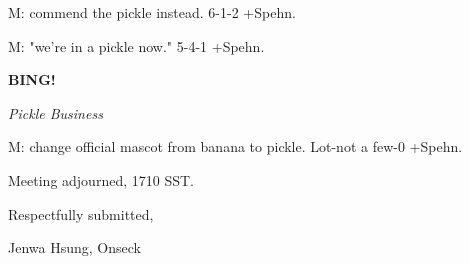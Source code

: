 \documentclass[12pt]{article}
\newcommand{\bing}{{\bf BING!} }
\newcommand{\goto}[1]{\bing \vskip 12pt \centerline{{\em{#1}}}}
\begin{document}
M: commend the pickle instead. 6-1-2 +Spehn.

M: "we're in a pickle now." 5-4-1 +Spehn.

\goto{Pickle Business}

M: change official mascot from banana to pickle. Lot-not a few-0 +Spehn.

\vspace{12pt}

\noindent
Meeting adjourned, 1710 SST.

\vspace{18pt}

\centerline{Respectfully submitted,}
\centerline{Jenwa Hsung, Onseck}
\end{document}
